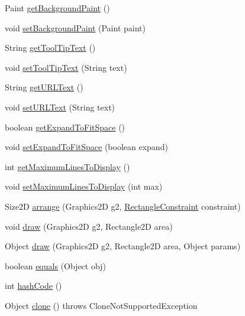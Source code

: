\begin{DoxyCompactItemize}
\item 
Paint \mbox{\hyperlink{classorg_1_1jfree_1_1chart_1_1title_1_1_text_title_a54a237d1222f43625c44f15cb7d2d713}{get\+Background\+Paint}} ()
\item 
void \mbox{\hyperlink{classorg_1_1jfree_1_1chart_1_1title_1_1_text_title_adb4e610b49ee1ca887a5f75841c89596}{set\+Background\+Paint}} (Paint paint)
\item 
String \mbox{\hyperlink{classorg_1_1jfree_1_1chart_1_1title_1_1_text_title_a7fdc11a016087dc74a1e5ba4d467b403}{get\+Tool\+Tip\+Text}} ()
\item 
void \mbox{\hyperlink{classorg_1_1jfree_1_1chart_1_1title_1_1_text_title_a0f7f3f30fe0bc99b5cf07770d91dfe00}{set\+Tool\+Tip\+Text}} (String text)
\item 
String \mbox{\hyperlink{classorg_1_1jfree_1_1chart_1_1title_1_1_text_title_a7640946c50c987e4830f69996841b1f6}{get\+U\+R\+L\+Text}} ()
\item 
void \mbox{\hyperlink{classorg_1_1jfree_1_1chart_1_1title_1_1_text_title_a8791ab5c8c4ad694bc0a5ee2ba0334a8}{set\+U\+R\+L\+Text}} (String text)
\item 
boolean \mbox{\hyperlink{classorg_1_1jfree_1_1chart_1_1title_1_1_text_title_a709a7c488b39c77cc46c6257f68b44f4}{get\+Expand\+To\+Fit\+Space}} ()
\item 
void \mbox{\hyperlink{classorg_1_1jfree_1_1chart_1_1title_1_1_text_title_a446efcd80f6830249c5a9baef561119b}{set\+Expand\+To\+Fit\+Space}} (boolean expand)
\item 
int \mbox{\hyperlink{classorg_1_1jfree_1_1chart_1_1title_1_1_text_title_ac50f9750ffef5ef70eb7b5990d0f50e3}{get\+Maximum\+Lines\+To\+Display}} ()
\item 
void \mbox{\hyperlink{classorg_1_1jfree_1_1chart_1_1title_1_1_text_title_af91101629f0c35a40042faa41287c421}{set\+Maximum\+Lines\+To\+Display}} (int max)
\item 
Size2D \mbox{\hyperlink{classorg_1_1jfree_1_1chart_1_1title_1_1_text_title_ab3eccb24ba6a7c3f411d86001f17e1e0}{arrange}} (Graphics2D g2, \mbox{\hyperlink{classorg_1_1jfree_1_1chart_1_1block_1_1_rectangle_constraint}{Rectangle\+Constraint}} constraint)
\item 
void \mbox{\hyperlink{classorg_1_1jfree_1_1chart_1_1title_1_1_text_title_a18f4f0fe150d298f6b85282690985a9d}{draw}} (Graphics2D g2, Rectangle2D area)
\item 
Object \mbox{\hyperlink{classorg_1_1jfree_1_1chart_1_1title_1_1_text_title_a0c8701f8d3a4844f5de8c08a86a2a652}{draw}} (Graphics2D g2, Rectangle2D area, Object params)
\item 
boolean \mbox{\hyperlink{classorg_1_1jfree_1_1chart_1_1title_1_1_text_title_ab9dabe6a6a1b0b5c72101bfa48337791}{equals}} (Object obj)
\item 
int \mbox{\hyperlink{classorg_1_1jfree_1_1chart_1_1title_1_1_text_title_a92b467e51c0bff6dac98efbfe955a07c}{hash\+Code}} ()
\item 
Object \mbox{\hyperlink{classorg_1_1jfree_1_1chart_1_1title_1_1_text_title_a205babe1a7ad91fbf8b444a926378481}{clone}} ()  throws Clone\+Not\+Supported\+Exception 
\end{DoxyCompactItemize}
